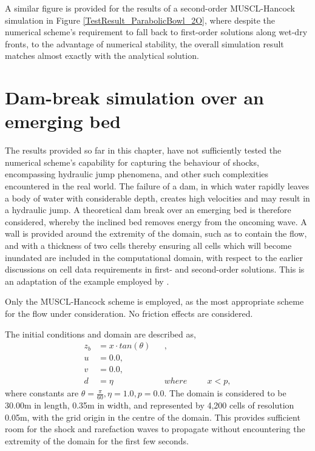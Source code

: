 A similar figure is provided for the results of a second-order MUSCL-Hancock simulation in Figure \ref{TestResult_ParabolicBowl_2O}, where despite the numerical scheme's requirement to fall back to first-order solutions along wet-dry fronts, to the advantage of numerical stability, the overall simulation result matches almost exactly with the analytical solution.

\section{Dam-break simulation over an emerging bed}

The results provided so far in this chapter, have not sufficiently tested the numerical scheme's capability for capturing the behaviour of shocks, encompassing hydraulic jump phenomena, and other such complexities encountered in the real world. The failure of a dam, in which water rapidly leaves a body of water with considerable depth, creates high velocities and may result in a hydraulic jump. A theoretical dam break over an emerging bed is therefore considered, whereby the inclined bed removes energy from the oncoming wave. A wall is provided around the extremity of the domain, such as to contain the flow, and with a thickness of two cells thereby ensuring all cells which will become inundated are included in the computational domain, with respect to the earlier discussions on cell data requirements in first- and second-order solutions. This is an adaptation of the example employed by \citet{Xing2010}.

Only the MUSCL-Hancock scheme is employed, as the most appropriate scheme for the flow under consideration. No friction effects are considered.

The initial conditions and domain are described as,
\begin{equation}
\label{Test_EmergingBed_Conditions}
\begin{alignedat}{4}
z_b & = x \cdot tan(\theta) &&, \\
u & = 0.0, && \\
v & = 0.0, && \\
d & = \eta && where \hspace{1cm} x < p,
\end{alignedat}
\end{equation}
where constants are $\displaystyle\theta = \frac{\pi}{60}, \eta = 1.0, p = 0.0$. The domain is considered to be 30.00m in length, 0.35m in width, and represented by 4,200 cells of resolution 0.05m, with the grid origin in the centre of the domain. This provides sufficient room for the shock and rarefaction waves to propagate without encountering the extremity of the domain for the first few seconds.

